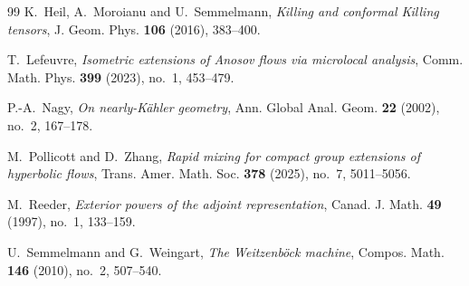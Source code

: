 \documentclass[reqno,11pt]{amsart}
\theoremstyle{definition}
\begin{document}
\begin{thebibliography}{99}
K.~Heil, A.~Moroianu and U.~Semmelmann,
\emph{Killing and conformal Killing tensors},
J. Geom. Phys. \textbf{106} (2016), 383--400.

T.~Lefeuvre,
\emph{Isometric extensions of Anosov flows via microlocal analysis},
Comm. Math. Phys. \textbf{399} (2023), no.~1, 453--479.

P.-A.~Nagy,
\emph{On nearly-K\"ahler geometry},
Ann. Global Anal. Geom. \textbf{22} (2002), no.~2, 167--178.

M.~Pollicott and D.~Zhang,
\emph{Rapid mixing for compact group extensions of hyperbolic flows},
Trans. Amer. Math. Soc. \textbf{378} (2025), no.~7, 5011--5056.

M.~Reeder,
\emph{Exterior powers of the adjoint representation},
Canad. J. Math. \textbf{49} (1997), no.~1, 133--159.

U.~Semmelmann and G.~Weingart,
\emph{The Weitzenb\"ock machine},
Compos. Math. \textbf{146} (2010), no.~2, 507--540.

\end{thebibliography}
\end{document}
